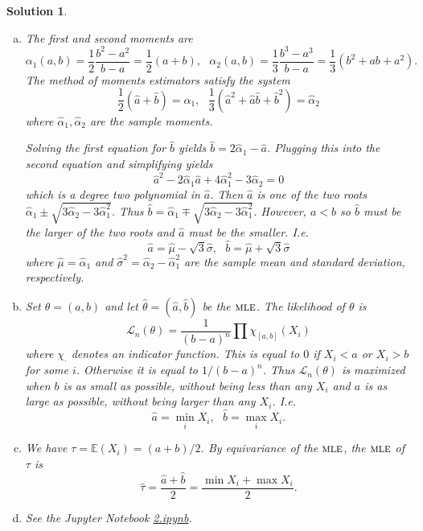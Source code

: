 \documentclass[10pt]{article}
\newtheorem*{sol}{Solution}
\newcommand{\E}{\mathbb{E}}
\newcommand{\MLE}{\textsc{mle}}
\begin{document}
\begin{enumerate}
\begin{sol}
\begin{enumerate}[(a)]
\item The first and second moments are
\[
\alpha_1(a, b) = \frac{1}{2}\frac{b^2-a^2}{b-a} =
\frac{1}{2}(a+b), \ \ \
\alpha_2(a, b) = \frac{1}{3}\frac{b^3-a^3}{b-a} =
\frac{1}{3}(b^2+ab+a^2).
\]
The method of moments estimators satisfy the system
\[
\frac{1}{2}(\hat a + \hat b) = \hat \alpha_1, \ \ \
\frac{1}{3}(\hat a^2 + \hat a \hat b + \hat b^2) = \hat \alpha_2
\]
where $\hat \alpha_1, \hat \alpha_2$ are the sample moments.

Solving the first equation for $\hat b$ yields $\hat b = 2\hat \alpha_1 - \hat a$.
Plugging this into the second equation and simplifying yields
\[
\hat a^2 - 2\hat \alpha_1 \hat a + 4\hat \alpha_1^2 - 3\hat \alpha_2 = 0
\]
which is a degree two polynomial in $\hat a$. Then $\hat a$ is one of the two roots
$\hat \alpha_1 \pm \sqrt{3\hat \alpha_2 - 3 \hat \alpha_1^2}$. Thus
$\hat b = \hat \alpha_1 \mp \sqrt{3\hat \alpha_2 - 3 \hat \alpha_1^2}$. However,
$a<b$ so $\hat b$ must be the larger of the two roots and $\hat a$ must be
the smaller. I.e.
\[
\hat a = \hat \mu - \sqrt{3}\hat \sigma, \ \ \
\hat b = \hat \mu + \sqrt{3}\hat \sigma
\]
where $\hat \mu=\hat \alpha_1$ and $\hat \sigma^2 = \hat \alpha_2 - \hat \alpha_1^2$
are the sample mean and standard deviation, respectively.

\item Set $\theta=(a,b)$ and let $\hat \theta=(\hat a,\hat b)$ be the $\MLE$.
The likelihood of $\theta$ is
\[
\mathcal{L}_n(\theta) = \frac{1}{(b-a)^n}\prod \chi_{[a,b]}(X_i)
\]
where $\chi_\cdot$ denotes an indicator function. This is equal to $0$
if $X_i<a$ or $X_i>b$ for some $i$. Otherwise it is equal to $1/(b-a)^n$.
Thus $\mathcal L_n(\theta)$ is maximized when $b$ is as small as possible, without
being less than any $X_i$ and $a$ is as large as possible, without being larger
than any $X_i$. I.e.
\[
\hat a = \min_i X_i, \ \ \ \hat b = \max_i X_i.
\]
\item We have $\tau = \E(X_i)=(a+b)/2$. By equivariance of the $\MLE$,
the $\MLE$ of $\tau$ is
\[
\hat \tau = \frac{\hat a + \hat b}{2} = \frac{\min X_i + \max X_i}{2}.
\]

\item
See the Jupyter Notebook
\href{https://github.com/ajrasmus/some_of_statistics/blob/main/chapter_9/2.ipynb}{2.ipynb}.
\end{enumerate}
\end{sol}


\end{enumerate}
\end{document}
